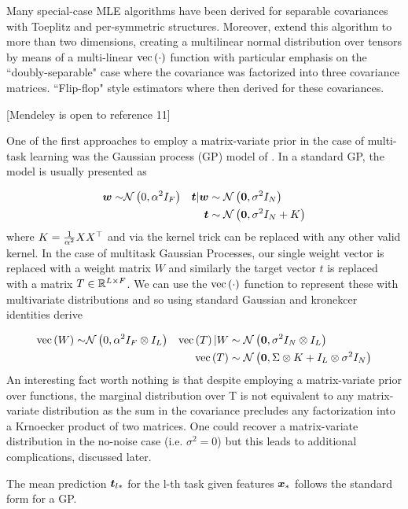 Many special-case MLE algorithms have been derived for separable covariances with Toeplitz\cite{Wirfalt2010} and per-symmetric\cite{Jansson} structures. Moreover, \cite{Ohlson2011}\cite{Ohlson2013} extend this algorithm to more than two dimensions, creating a multilinear normal distribution over tensors by means of a multi-linear $\text{vec}\left(\cdot\right)$ function with particular emphasis on the ``doubly-separable" case where the covariance was factorized into three covariance matrices. ``Flip-flop" style estimators where then derived for these covariances.


[Mendeley is open to reference 11]


One of the first approaches to employ a matrix-variate prior in the case of multi-task learning was the Gaussian process (GP) model of \cite{Bonilla2008}. In a standard GP, the model is usually presented as

\begin{align}
\bm w \sim & \mathcal{N} \left( {0}, {\alpha^2 I_F} \right) & \bm t|\bm w & \sim \mathcal{N} \left( {\bm 0}, {\sigma^2 I_N} \right) \\
& & \bm t & \sim \mathcal{N} \left( {\bm 0}, {\sigma^2I_N + K} \right)
\end{align}
where $K = \frac{1}{\alpha^2} X X^\top$ and via the kernel trick\cite{Jst2004} can be replaced with any other valid kernel. In the case of multitask Gaussian Processes, our single weight vector is replaced with a weight matrix $W$ and similarly the target vector $t$ is replaced with a matrix $T \in { \mathbb{R}^{L \times F} }$. We can use the $\text{vec}\left(\cdot\right)$ function to represent these with multivariate distributions and so using standard Gaussian\cite{Bishop2006} and kronekcer\cite{Minka2000a} identities derive

\begin{align}
\text{vec}\left(W\right) \sim & \mathcal{N} \left( {0}, {\alpha^2 I_F \otimes I_L} \right) & \text{vec}\left(T\right)|W & \sim \mathcal{N} \left( {\bm 0}, {\sigma^2 I_N \otimes I_L} \right) \\
& & \text{vec}\left(T\right) & \sim \mathcal{N} \left( {\bm 0}, {\Sigma \otimes K + I_L \otimes \sigma^2I_N} \right)
\end{align}
An interesting fact worth nothing is that despite employing a matrix-variate prior over functions, the marginal distribution over T is not equivalent to any matrix-variate distribution as the sum in the covariance precludes any factorization into a Krnoecker product of two matrices. One could recover a matrix-variate distribution in the no-noise case (i.e. $\sigma^2 = 0$) but this leads to additional complications, discussed later.

The mean prediction $\bm t_{l*}$ for the l-th task given features $\bm x_*$ follows the standard form for a GP.

